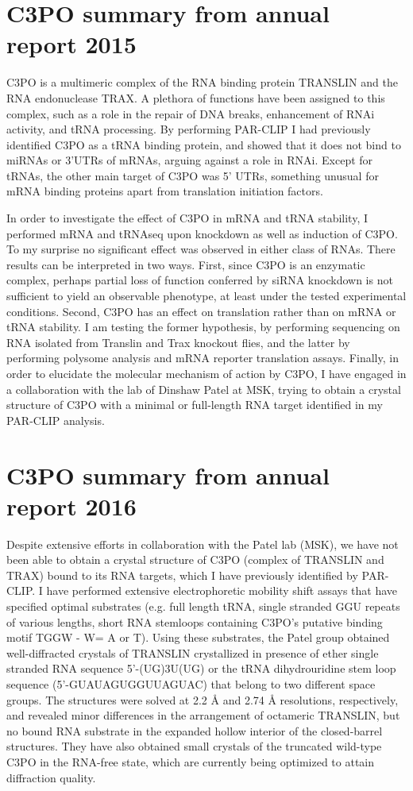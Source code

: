 \documentclass[12pt]{rockefeller}
\begin{document}
\section{C3PO summary from annual report 2015}
C3PO is a multimeric complex of the RNA binding protein TRANSLIN and the RNA endonuclease TRAX. A plethora of functions have been assigned to this complex, such as a role in the repair of DNA breaks, enhancement of RNAi activity, and tRNA processing. By performing PAR-CLIP I had previously identified C3PO as a tRNA binding protein, and showed that it does not bind to miRNAs or 3’UTRs of mRNAs, arguing against a role in RNAi. Except for tRNAs, the other main target of C3PO was 5’ UTRs, something unusual for mRNA binding proteins apart from translation initiation factors. 

In order to investigate the effect of C3PO in mRNA and tRNA stability, I performed mRNA and tRNAseq upon knockdown as well as induction of C3PO. To my surprise no significant effect was observed in either class of RNAs. There results can be interpreted in two ways. First, since C3PO is an enzymatic complex, perhaps partial loss of function conferred by siRNA knockdown is not sufficient to yield an observable phenotype, at least under the tested experimental conditions. Second, C3PO has an effect on translation rather than on mRNA or tRNA stability. I am testing the former hypothesis, by performing sequencing on RNA isolated from Translin and Trax knockout flies, and the latter by performing polysome analysis and mRNA reporter translation assays. Finally, in order to elucidate the molecular mechanism of action by C3PO, I have engaged in a collaboration with the lab of Dinshaw Patel at MSK, trying to obtain a crystal structure of C3PO with a minimal or full-length RNA target identified in my PAR-CLIP analysis. 

\section{C3PO summary from annual report 2016}
Despite extensive efforts in collaboration with the Patel lab (MSK), we have not been able to obtain a crystal structure of C3PO (complex of TRANSLIN and TRAX) bound to its RNA targets, which I have previously identified by PAR-CLIP. I have performed extensive electrophoretic mobility shift assays that have specified optimal substrates (e.g. full length tRNA, single stranded GGU repeats of various lengths, short RNA stemloops containing C3PO’s putative binding motif TGGW - W= A or T). Using these substrates, the Patel group obtained well-diffracted crystals of TRANSLIN crystallized in presence of ether single stranded RNA sequence 5’-(UG)3U(UG) or the tRNA dihydrouridine stem loop sequence (5’-GUAUAGUGGUUAGUAC) that belong to two different space groups. The structures were solved at 2.2 Å and 2.74 Å resolutions, respectively, and revealed minor differences in the arrangement of octameric TRANSLIN, but no bound RNA substrate in the expanded hollow interior of the closed-barrel structures. They have also obtained small crystals of the truncated wild-type C3PO in the RNA-free state, which are currently being optimized to attain diffraction quality.
	
\end{document}
